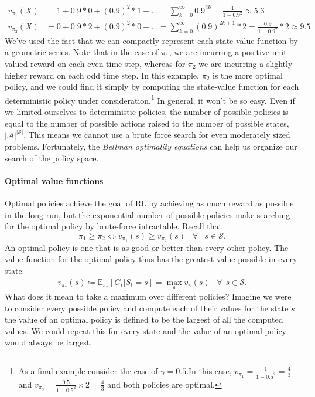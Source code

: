 \documentclass[12pt]{article}
\begin{document}
\begin{align*}
  v_{\pi_1}(X) &= 1 + 0.9 * 0 + (0.9)^2 * 1 + \ldots = \sum_{k=0}^{\infty} 0.9^{2k} = \frac{1}{1-0.9^2} \approx 5.3 \\
  v_{\pi_2}(X) &= 0 + 0.9 * 2 + (0.9)^2 * 0 + \ldots = \sum_{k=0}^{\infty} (0.9)^{2k+1}*2 = \frac{0.9}{1-0.9^2} * 2 \approx 9.5
\end{align*}
We've used the fact that we can compactly represent each state-value function by a geometric series. Note that in the case of $\pi_1$, we are incurring a positive unit valued reward on each even time step, whereas for $\pi_2$ we are incurring a slightly higher reward on each odd time step. In this example, $\pi_2$ is the more optimal policy, and we could find it simply by computing the state-value function for each deterministic policy under consideration.\footnote{As a final example consider the case of $\gamma = 0.5$.In this case, $v_{\pi_1} = \frac{1}{1-0.5^2} = \frac{4}{3}$ and $v_{\pi_2} = \frac{0.5}{1 - 0.5^2} \times 2 = \frac{4}{3}$ and both policies are optimal.}
In general, it won't be so easy. Even if we limited ourselves to deterministic policies, the number of possible policies is equal to the number of possible actions raised to the number of possible states, $|\mathcal A|^{|\mathcal S|}$. This means we cannot use a brute force search for even moderately sized problems. Fortunately, the \emph{Bellman optimality equations} can help us organize our search of the policy space.

\paragraph{Optimal value functions}
Optimal policies achieve the goal of RL by achieving as much reward as possible in the long run, but the exponential number of possible policies make searching for the optimal policy by brute-force intractable.
Recall that
\[
  \pi_1 \geq \pi_2 \iff v_{\pi_1}(s) \geq v_{\pi_2}(s) \hspace{10pt} \forall \hspace{10pt} s \in \mathcal S.
\]
An optimal policy is one that is as good or better than every other policy. The value function for the optimal policy thus has the greatest value possible in every state.
\begin{align*}
  v_{\pi_*}(s) \coloneqq \mathbb E_{\pi_*} \left[ G_t | S_t = s \right] = \max_\pi v_\pi (s) \hspace{10pt} \forall \hspace{5pt} s \in \mathcal S.
\end{align*}
What does it mean to take a maximum over different policies? Imagine we were to consider every possible policy and compute each of their values for the state $s$: the value of an optimal policy is defined to be the largest of all the computed values. We could repeat this for every state and the value of an optimal policy would always be largest. 
\end{document}
